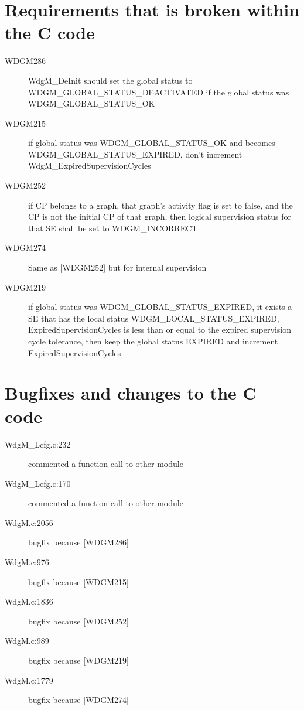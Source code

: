 \documentclass[11pt,a4paper]{article}
\begin{document}
\section{Requirements that is broken within the C code}
\begin{description}
  \item[WDGM286] \parbox[t]{0.8\linewidth}{WdgM\_DeInit should set the global
      status to WDGM\_GLOBAL\_STATUS\_DEACTIVATED if the global status was
    WDGM\_GLOBAL\_STATUS\_OK}
  \item[WDGM215] \parbox[t]{0.8\linewidth}{if global status was
      WDGM\_GLOBAL\_STATUS\_OK and becomes WDGM\_GLOBAL\_STATUS\_EXPIRED, don't
      increment WdgM\_ExpiredSupervisionCycles}
  \item[WDGM252] \parbox[t]{0.8\linewidth}{if CP belongs to a graph, that
      graph's activity flag is set to false, and the CP is not the initial CP of
      that graph, then logical supervision status for that SE shall be set to
      WDGM\_INCORRECT}
  \item[WDGM274] \parbox[t]{0.8\linewidth}{Same as [WDGM252] but for internal
      supervision}
  \item[WDGM219] \parbox[t]{0.8\linewidth}{if global status was
      WDGM\_GLOBAL\_STATUS\_EXPIRED, it exists a SE that has the local status
      WDGM\_LOCAL\_STATUS\_EXPIRED, ExpiredSupervisionCycles is less than or
      equal to the expired supervision cycle tolerance, then keep the global
      status EXPIRED and increment ExpiredSupervisionCycles}
\end{description}


\section{Bugfixes and changes to the C code}
\begin{description}
  \item[WdgM\_Lcfg.c:232] commented a function call to other module
  \item[WdgM\_Lcfg.c:170] commented a function call to other module
  \item[WdgM.c:2056] bugfix because [WDGM286]
  \item[WdgM.c:976] bugfix because [WDGM215]
  \item[WdgM.c:1836] bugfix because [WDGM252]
  \item[WdgM.c:989] bugfix because [WDGM219]
  \item[WdgM.c:1779] bugfix because [WDGM274]
\end{description}
\end{document}
